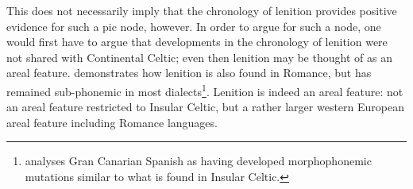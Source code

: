 This does not necessarily imply that the chronology of lenition provides positive evidence for such a \gls{pic} node, however. In order to argue for such a node, one would first have to argue that developments in the chronology of lenition were not shared with Continental Celtic; even then lenition may be thought of as an areal feature. \Textcite{martinet_celtic_1952} demonstrates how lenition is also found in \eg Romance, but has remained sub-phonemic in most dialects\footnote{\Textcite{Oft_Lenition85} analyses Gran Canarian Spanish as having developed morphophonemic mutations similar to what is found in Insular Celtic.}. Lenition is indeed an areal feature: not an areal feature restricted to Insular Celtic, but a rather larger western European areal feature including  Romance languages.




